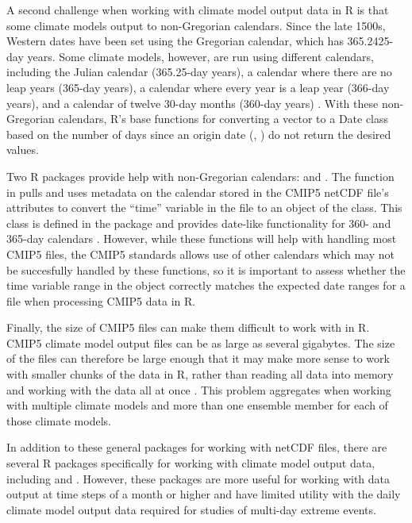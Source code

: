 A second challenge when working with climate model output data in R is
that some climate models output to non-Gregorian calendars. Since the
late 1500s, Western dates have been set using the Gregorian calendar,
which has 365.2425-day years. Some climate models, however, are run
using different calendars, including the Julian calendar (365.25-day
years), a calendar where there are no leap years (365-day years), a
calendar where every year is a leap year (366-day years), and a calendar
of twelve 30-day months (360-day years) \citep{cfconventions}. With
these non-Gregorian calendars, R's base functions for converting a
vector to a Date class based on the number of days since an origin date
(, ) do not return the desired values.

Two R packages provide help with non-Gregorian calendars:
 \citep{PCICt} and 
\citep{ncdf4.helpers}. The  function in
 pulls and uses metadata on the calendar stored in
the CMIP5 netCDF file's attributes to convert the ``time'' variable in
the file to an object of the  class. This class is defined
in the  package and provides date-like functionality for 360-
and 365-day calendars \citep{PCICt}. However, while these functions will
help with handling most CMIP5 files, the CMIP5 standards allows use of
other calendars which may not be succesfully handled by these functions,
so it is important to assess whether the time variable range in the
 object correctly matches the expected date ranges for a
file when processing CMIP5 data in R.

Finally, the size of CMIP5 files can make them difficult to work with in
R. CMIP5 climate model output files can be as large as several
gigabytes. The size of the files can therefore be large enough that it
may make more sense to work with smaller chunks of the data in R, rather
than reading all data into memory and working with the data all at once
\citep{RCMIP5}. This problem aggregates when working with multiple
climate models and more than one ensemble member for each of those
climate models.

In addition to these general packages for working with netCDF files,
there are several R packages specifically for working with climate model
output data, including  \citep{RCMIP5} and 
\citep{wux}. However, these packages are more useful for working with
data output at time steps of a month or higher and have limited utility
with the daily climate model output data required for studies of
multi-day extreme events.

